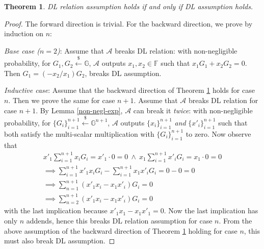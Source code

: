 \documentclass{article}
\newtheorem{theorem}{Theorem}[section]
\begin{document}
\begin{theorem}\label{equiv-demo}
DL relation assumption holds if and only if DL assumption holds.
\end{theorem}
\begin{proof}
The forward direction is trivial. For the backward direction, we prove by induction on $n$:

\textit{Base case ($n=2$)}: Assume that $\mathcal{A}$ breaks DL relation: with non-negligible probability, for $G_1, G_2 \xleftarrow{\$} \mathbb{G}$, $\mathcal{A}$ outputs $x_1, x_2 \in \mathbb{F}$ such that $x_1 G_1 + x_2 G_2 = 0$. Then $G_1 = (-x_2 / x_1) G_2$, breaks DL assumption.

\textit{Inductive case}: Assume that the backward direction of Theorem \ref{equiv-demo} holds for case $n$. Then we prove the same for case $n+1$. Assume that $\mathcal{A}$ breaks DL relation for case $n+1$. By Lemma \ref{non-negl-exp}, $\mathcal{A}$ can break it \textit{twice}: with non-negligible probability, for $\{G_i\}_{i=1}^{n+1} \xleftarrow{\$} \mathbb{G}^{n+1}$, $\mathcal{A}$ outputs $\{x_i\}_{i=1}^{n+1}$ \textit{and} $\{x'_i\}_{i=1}^{n+1}$ such that both satisfy the multi-scalar multiplication with $\{G_i\}_{i=1}^{n+1}$ to zero. Now observe that
\begin{align*}
x'_1 \sum_{i=1}^{n+1} x_i G_i = x'_1 \cdot 0 = 0\ \wedge\ x_1 \sum_{i=1}^{n+1} x'_i G_i = x_1 \cdot 0 = 0 \\
\implies \sum_{i=1}^{n+1} x'_1 x_i G_i - \sum_{i=1}^{n+1} x_1 x'_i G_i = 0 - 0 = 0 \\
\implies \sum_{n=1}^{n+1} (x'_1 x_i - x_1 x'_i) G_i = 0 \\
\implies  \sum_{n=2}^{n+1} (x'_1 x_i - x_1 x'_i) G_i = 0
\end{align*}
with the last implication because $x'_1 x_1 - x_1 x'_1 = 0$. Now the last implication has only $n$ addends, hence this breaks DL relation assumption for case $n$. From the above assumption of the backward direction of Theorem \ref{equiv-demo} holding for case $n$, this must also break DL assumption.
\end{proof}


\end{document}
